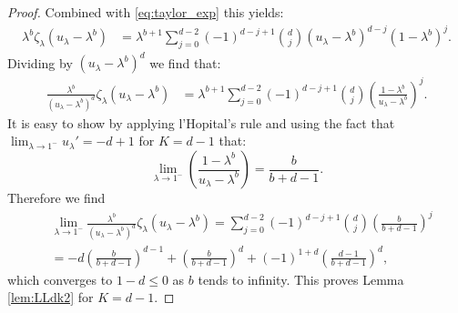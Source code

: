 \documentclass[12pt]{report}
\begin{document}
\begin{proof}
Combined with \eqref{eq:taylor_exp} this yields:
\begin{align*}
\lambda^b \zeta_\lambda(u_\lambda-\lambda^b)
&= \lambda^{b+1} \sum_{j=0}^{d-2} (-1)^{d-j+1} \binom{d}{j} (u_\lambda-\lambda^b)^{d-j} (1-\lambda^b)^j.
\end{align*}
Dividing by $(u_\lambda-\lambda^b)^d$ we find that:
\begin{align*}
\frac{\lambda^b}{(u_\lambda-\lambda^b)^d} \zeta_\lambda(u_\lambda-\lambda^b)
&=\lambda^{b+1} \sum_{j=0}^{d-2} (-1)^{d-j+1} \binom{d}{j} \left(\frac{1-\lambda^b}{u_\lambda-\lambda^b}\right)^j.
\end{align*}
It is easy to show by applying l'Hopital's rule and using the fact that\newline $\lim_{\lambda \rightarrow 1^-}  u_\lambda' = -d+1$ for $K=d-1$ that: 
$$
\lim_{\lambda \rightarrow 1^-} \left( \frac{1-\lambda^b}{u_\lambda - \lambda^b} \right)
=
\frac{b}{b+d-1}.
$$
Therefore we find
\begin{align*}
&\lim_{\lambda \rightarrow 1^-} \frac{\lambda^b}{(u_\lambda-\lambda^b)^d} \zeta_\lambda(u_\lambda-\lambda^b) = \sum_{j=0}^{d-2} (-1)^{d-j+1} \binom{d}{j} \left(\frac{b}{b+d-1}\right)^j\\
&=-d \left( \frac{b}{b+d-1} \right)^{d-1} + \left(\frac{b}{b+d-1}\right)^d + (-1)^{1+d} \left( \frac{d-1}{b+d-1} \right)^d,
\end{align*}
which converges to $1-d \leq 0$ as $b$ tends to infinity. This proves Lemma \ref{lem:LLdk2}
for $K=d-1$.


\end{proof}
\end{document}
